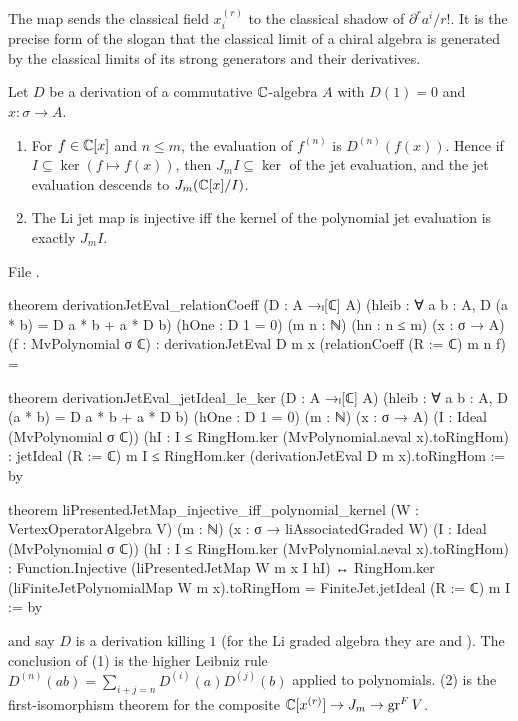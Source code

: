 \begin{physics}
The map sends the classical field $x_i^{(r)}$ to the classical shadow of $\partial^ra^i/r!$. It is the precise form of the slogan that
the classical limit of a chiral algebra is generated by the classical limits of its strong generators and their derivatives.
\end{physics}


\begin{theorem}\label{l11:thm:jetmap}
Let $D$ be a derivation of a commutative ${\mathbb{C}}$-algebra $A$ with $D(1) = 0$ and $x:\sigma\to A$.
\begin{enumerate}
\item For $f\in{\mathbb{C}}[x]$ and $n\le m$, the evaluation of $f^{(n)}$ is $D^{(n)}(f(x))$. Hence if $I\subseteq\ker(f\mapsto
  f(x))$, then $J_mI\subseteq\ker$ of the jet evaluation, and the jet evaluation descends to $J_m({\mathbb{C}}[x]/I)$.
\item The Li jet map is injective iff the kernel of the polynomial jet evaluation is exactly $J_mI$.
\end{enumerate}
\end{theorem}
\noindent File .
\begin{leancode}
theorem derivationJetEval_relationCoeff (D : A →ₗ[ℂ] A)
    (hleib : ∀ a b : A, D (a * b) = D a * b + a * D b) (hOne : D 1 = 0)
    (m n : ℕ) (hn : n ≤ m)
    (x : σ → A) (f : MvPolynomial σ ℂ) :
    derivationJetEval D m x (relationCoeff (R := ℂ) m n f) =

theorem derivationJetEval_jetIdeal_le_ker (D : A →ₗ[ℂ] A)
    (hleib : ∀ a b : A, D (a * b) = D a * b + a * D b) (hOne : D 1 = 0)
    (m : ℕ) (x : σ → A)
    (I : Ideal (MvPolynomial σ ℂ))
    (hI : I ≤ RingHom.ker (MvPolynomial.aeval x).toRingHom) :
    jetIdeal (R := ℂ) m I ≤ RingHom.ker (derivationJetEval D m x).toRingHom := by

theorem liPresentedJetMap_injective_iff_polynomial_kernel
    (W : VertexOperatorAlgebra V) (m : ℕ)
    (x : σ → liAssociatedGraded W) (I : Ideal (MvPolynomial σ ℂ))
    (hI : I ≤ RingHom.ker (MvPolynomial.aeval x).toRingHom) :
    Function.Injective (liPresentedJetMap W m x I hI) ↔
      RingHom.ker (liFiniteJetPolynomialMap W m x).toRingHom =
        FiniteJet.jetIdeal (R := ℂ) m I := by
\end{leancode}

\begin{dictionary}
 and  say $D$ is a derivation killing $1$ (for the Li graded algebra they are
\allowbreak{} and \allowbreak{}). The conclusion of (1)
is the higher Leibniz rule $D^{(n)}(ab) = \sum_{i+j=n}D^{(i)}(a)D^{(j)}(b)$ applied to polynomials. (2) is the
first-isomorphism theorem for the composite ${\mathbb{C}}[x^{(r)}]\to J_m\to\operatorname{gr}^FV$.
\end{dictionary}

